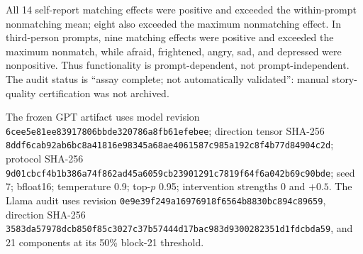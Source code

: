 \begin{table}[t]
\caption{Synthetic steering completion assay at strength $+0.5$ versus 0, block 16. Each effect is the change in teacher-forced completion score for the matching label; Max nonmatch is the largest nonmatching-label change in the same prompt. The unit is one fixed synthetic prompt/label completion, so no participant CI or $p$ value applies.}
\label{tab:app-steering}
\centering
\scriptsize
{}
\end{table}

All 14 self-report matching effects were positive and exceeded the within-prompt nonmatching mean; eight also exceeded the maximum nonmatching effect. In third-person prompts, nine matching effects were positive and exceeded the maximum nonmatch, while afraid, frightened, angry, sad, and depressed were nonpositive. Thus functionality is prompt-dependent, not prompt-independent. The audit status is ``assay complete; not automatically validated'': manual story-quality certification was not archived.

The frozen GPT artifact uses model revision \texttt{6cee5e81ee83917806bbde320786a8fb61efebee}; direction tensor SHA-256 \texttt{8ddf6cab92ab6bc8a41816e98345a68ae4061587c985a192c8f4b77d84904c2d}; protocol SHA-256 \texttt{9d01cbcf4b1b386a74f862ad45a6059cb23901291c7819f64f6a042b69c90bde}; seed 7; bfloat16; temperature 0.9; top-$p$ 0.95; intervention strengths 0 and $+0.5$. The Llama audit uses revision \texttt{0e9e39f249a16976918f6564b8830bc894c89659}, direction SHA-256 \texttt{3583da57978dcb850f85c3027c37b57444d17bac983d9300282351d1fdcbda59}, and 21 components at its 50\% block-21 threshold.

